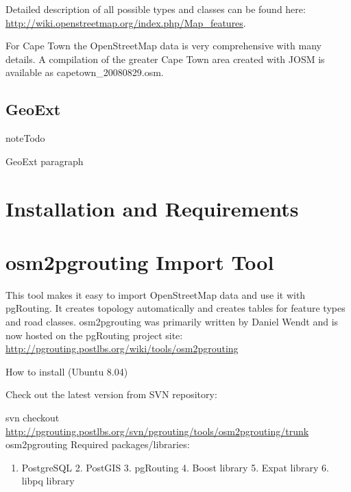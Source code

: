 \documentclass[a4paper,10pt,english]{manual}
\begin{document}
Detailed description of all possible types and classes can be found here:  \href{http://wiki.openstreetmap.org/index.php/Map\_features}{http://wiki.openstreetmap.org/index.php/Map\_features}.

For Cape Town the OpenStreetMap data is very comprehensive with many details. A compilation of the greater Cape Town area created with JOSM is available as capetown\_20080829.osm.


\section{GeoExt}
\hypertarget{todo-28}{}
\begin{notice}{note}{Todo}

GeoExt paragraph
\end{notice}

\resetcurrentobjects
\hypertarget{--doc-chapters/installation}{}

\chapter{Installation and Requirements}

\resetcurrentobjects
\hypertarget{--doc-chapters/osm2pgrouting}{}

\chapter{osm2pgrouting Import Tool}

This tool makes it easy to import OpenStreetMap data and use it with pgRouting. It creates topology automatically and creates tables for feature types and road classes. osm2pgrouting was primarily written by Daniel Wendt and is now hosted on the pgRouting project site: \href{http://pgrouting.postlbs.org/wiki/tools/osm2pgrouting}{http://pgrouting.postlbs.org/wiki/tools/osm2pgrouting}

How to install (Ubuntu 8.04)

Check out the latest version from SVN repository:

svn checkout \href{http://pgrouting.postlbs.org/svn/pgrouting/tools/osm2pgrouting/trunk}{http://pgrouting.postlbs.org/svn/pgrouting/tools/osm2pgrouting/trunk} osm2pgrouting
Required packages/libraries:
\begin{enumerate}
\item {} 
PostgreSQL 2. PostGIS 3. pgRouting 4. Boost library 5. Expat library 6. libpq library

\end{enumerate}
\end{document}
